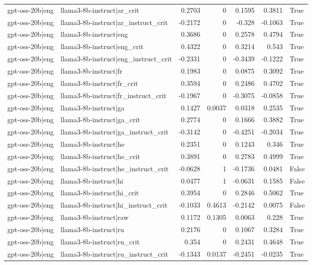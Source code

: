 \begin{table}
\begin{tabular}{l l r r r r l}
gpt-oss-20b|eng & llama3-8b-instruct|ar_crit & 0.2703 & 0 & 0.1595 & 0.3811 & True \\
gpt-oss-20b|eng & llama3-8b-instruct|ar_instruct_crit & -0.2172 & 0 & -0.328 & -0.1063 & True \\
gpt-oss-20b|eng & llama3-8b-instruct|eng & 0.3686 & 0 & 0.2578 & 0.4794 & True \\
gpt-oss-20b|eng & llama3-8b-instruct|eng_crit & 0.4322 & 0 & 0.3214 & 0.543 & True \\
gpt-oss-20b|eng & llama3-8b-instruct|eng_instruct_crit & -0.2331 & 0 & -0.3439 & -0.1222 & True \\
gpt-oss-20b|eng & llama3-8b-instruct|fr & 0.1983 & 0 & 0.0875 & 0.3092 & True \\
gpt-oss-20b|eng & llama3-8b-instruct|fr_crit & 0.3594 & 0 & 0.2486 & 0.4702 & True \\
gpt-oss-20b|eng & llama3-8b-instruct|fr_instruct_crit & -0.1967 & 0 & -0.3075 & -0.0858 & True \\
gpt-oss-20b|eng & llama3-8b-instruct|ga & 0.1427 & 0.0037 & 0.0318 & 0.2535 & True \\
gpt-oss-20b|eng & llama3-8b-instruct|ga_crit & 0.2774 & 0 & 0.1666 & 0.3882 & True \\
gpt-oss-20b|eng & llama3-8b-instruct|ga_instruct_crit & -0.3142 & 0 & -0.4251 & -0.2034 & True \\
gpt-oss-20b|eng & llama3-8b-instruct|he & 0.2351 & 0 & 0.1243 & 0.346 & True \\
gpt-oss-20b|eng & llama3-8b-instruct|he_crit & 0.3891 & 0 & 0.2783 & 0.4999 & True \\
gpt-oss-20b|eng & llama3-8b-instruct|he_instruct_crit & -0.0628 & 1 & -0.1736 & 0.0481 & False \\
gpt-oss-20b|eng & llama3-8b-instruct|hi & 0.0477 & 1 & -0.0631 & 0.1585 & False \\
gpt-oss-20b|eng & llama3-8b-instruct|hi_crit & 0.3954 & 0 & 0.2846 & 0.5062 & True \\
gpt-oss-20b|eng & llama3-8b-instruct|hi_instruct_crit & -0.1033 & 0.4613 & -0.2142 & 0.0075 & False \\
gpt-oss-20b|eng & llama3-8b-instruct|raw & 0.1172 & 0.1305 & 0.0063 & 0.228 & True \\
gpt-oss-20b|eng & llama3-8b-instruct|ru & 0.2176 & 0 & 0.1067 & 0.3284 & True \\
gpt-oss-20b|eng & llama3-8b-instruct|ru_crit & 0.354 & 0 & 0.2431 & 0.4648 & True \\
gpt-oss-20b|eng & llama3-8b-instruct|ru_instruct_crit & -0.1343 & 0.0137 & -0.2451 & -0.0235 & True \\

\end{tabular}
\end{table}
